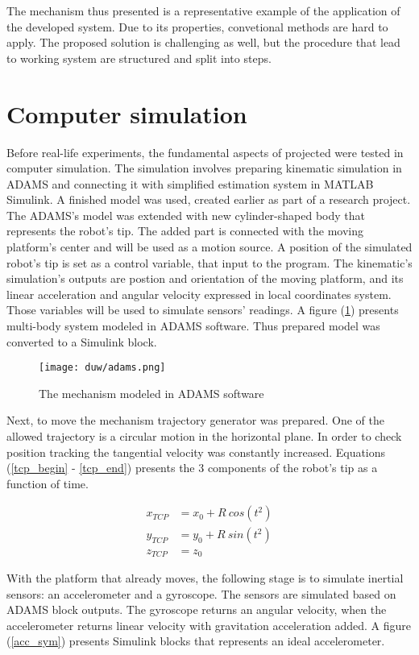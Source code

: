 The mechanism thus presented is a representative example of the application of the developed system. Due to its properties, convetional methods are hard to apply. The proposed solution is challenging as well, but the procedure that lead to working system are structured and split into steps. 

\section{Computer simulation}

Before real-life experiments, the fundamental aspects of projected were tested in computer simulation. The simulation involves preparing kinematic simulation in ADAMS and connecting it with simplified estimation system in MATLAB Simulink. A finished model was used, created earlier as part of a research project. The ADAMS's model was extended with new cylinder-shaped body that represents the robot's tip. The added part is connected with the moving platform's center and will be used as a motion source. A position of the simulated robot's tip is set as a control variable, that input to the program. The kinematic's simulation's outputs are postion and orientation of the moving platform, and its linear acceleration and angular velocity expressed in local coordinates system. Those variables will be used to simulate sensors' readings.
A figure (\ref{adams}) presents multi-body system modeled in ADAMS software. Thus prepared model was converted to a Simulink block. 

\begin{figure}[!h]
	\centering
	\texttt{[image: duw/adams.png]}
	\caption{The mechanism modeled in ADAMS software}
	\label{adams}
\end{figure}

Next, to move the mechanism trajectory generator was prepared. One of the allowed trajectory is a circular motion in the horizontal plane. In order to check position tracking the tangential velocity was constantly increased. Equations (\ref{tcp_begin} - \ref{tcp_end}) presents the 3 components of the robot's tip as a function of time.

\begin{align}
	x_{TCP} &= x_0 +  R\ cos( t^2 )
	\label{tcp_begin}\\
	y_{TCP} &= y_0  + R\ sin( t^2 )\\
	z_{TCP} &= z_0
	\label{tcp_end}
\end{align}

With the platform that already moves, the following stage is to simulate inertial sensors: an accelerometer and a gyroscope. The sensors are simulated based on ADAMS block outputs. The gyroscope returns an angular velocity, when the accelerometer returns linear velocity with gravitation acceleration added. A figure (\ref{acc_sym}) presents Simulink blocks that represents an ideal accelerometer.

